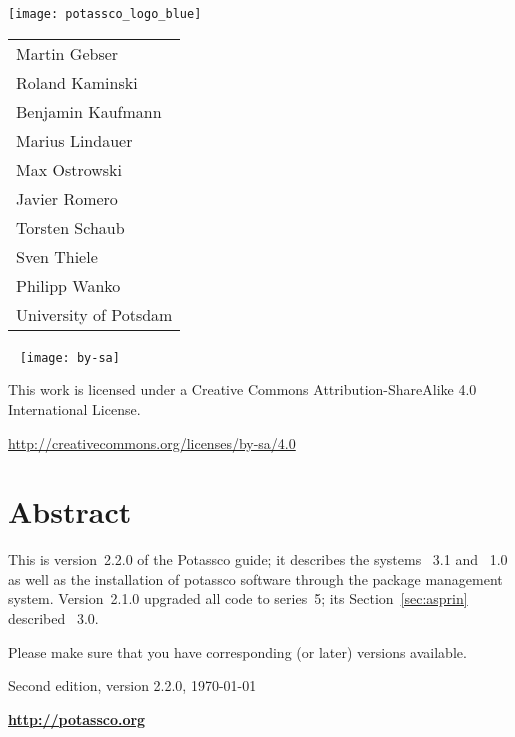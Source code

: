 \thispagestyle{empty}
\bigskip
\noindent
\texttt{[image: potassco\_logo\_blue]}
\bigskip

\vfill

\hspace{5pt}
{\Large\color{potcolor}
\begin{tabular}{l}
Martin Gebser \\
Roland Kaminski \\
Benjamin Kaufmann \\
Marius Lindauer \\
Max Ostrowski \\
Javier Romero \\
Torsten Schaub \\
Sven Thiele \\
Philipp Wanko \\[30pt]
University of Potsdam
\end{tabular}}

\newpage
\thispagestyle{empty}\
\vfill
\noindent
\texttt{[image: by-sa]}

\bigskip

\noindent
This work is licensed under a Creative Commons Attribution-ShareAlike 4.0\\ International License.

\medskip

\noindent
\url{http://creativecommons.org/licenses/by-sa/4.0}
\newpage
\thispagestyle{empty}\
\section*{Abstract}


\bigskip
\noindent
This is version~2.2.0 of the Potassco guide;
it describes the systems \asprin~3.1 and ~1.0
as well as the installation of potassco software through
the \conda{} package management system.
%
Version~2.1.0 upgraded all code to \clingo{} series~5;
its Section~\ref{sec:asprin} described \asprin~3.0.

\medskip
\noindent
Please make sure that you have corresponding (or later) versions available.

\vfill

\begin{center}

\end{center}

\vfill

\noindent
Second edition, version 2.2.0, \today\ %

\bigskip
\noindent
{\LARGE\bf\url{http://potassco.org}}





